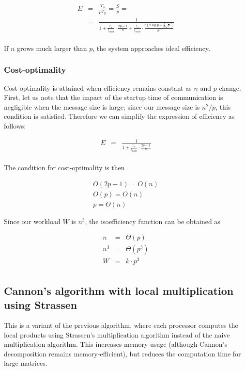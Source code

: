 \documentclass{article}
\begin{document}
\begin{eqnarray*}
E &=& \frac{T_s}{pT_p} = \frac{S}{ p} = \\
&=& \frac{ 1 }{ 1 + \frac{t_w}{t_{mult}} \cdot \frac{2p-1}{n} + \frac{t_s}{t_{mult}} \cdot \frac{p\left(2 \log{p} + \frac{3}{2} \sqrt{p}\right)}{n^3} } \\
\end{eqnarray*}

If $n$ grows much larger than $p$, the system approaches ideal efficiency.

\subsubsection{Cost-optimality}

Cost-optimality is attained when efficiency remains constant as $n$ and $p$ change.
First, let us note that the impact of the startup time of communication is negligible when the message size is large; since our message size is $n^2/p$, this condition is satisfied. Therefore we can simplify the expression of efficiency as follows:

\begin{eqnarray*}
E &=& \frac{ 1 }{ 1 + \frac{t_w}{t_{mult}} \cdot \frac{2p-1}{n} } \\
\end{eqnarray*}

The condition for cost-optimality is then

\begin{eqnarray*}
O(2p-1) = O(n) \\
O(p) = O(n) \\
p = \Theta(n)
\end{eqnarray*}

Since our workload $W$ is $n^3$, the isoefficiency function can be obtained as

\begin{eqnarray*}
n &=& \Theta (p) \\
n^3 &=& \Theta (p^3) \\
W &=& k \cdot p^3 \\
\end{eqnarray*}


\subsection{Cannon's algorithm with local multiplication using Strassen}

This is a variant of the previous algorithm, where each processor computes the local products using Strassen's multiplication algorithm instead of the naive multiplication algorithm. This increases memory usage (although Cannon's decomposition remains memory-efficient), but reduces the computation time for large matrices.
\end{document}

